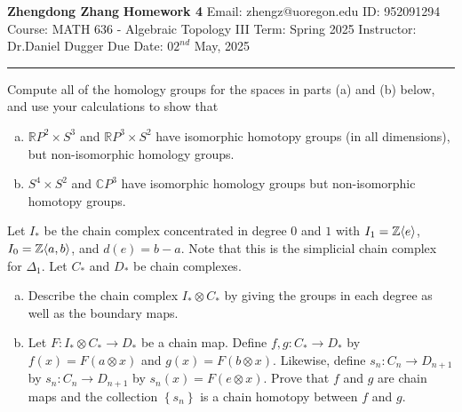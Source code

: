 \documentclass[a4paper, 12pt]{article}
\begin{document}
\noindent

\large\textbf{Zhengdong Zhang} \hfill \textbf{Homework 4}
Email: zhengz@uoregon.edu \hfill ID: 952091294
\normalsize Course: MATH 636 - Algebraic Topology III \hfill Term: Spring 2025
Instructor: Dr.Daniel Dugger \hfill Due Date: $02^{nd}$ May, 2025 
\noindent\rule{7in}{2.8pt}

\begin{problem}{1}
Compute all of the homology groups for the spaces in parts (a) and (b) below, and use your calculations to show that 
\begin{enumerate}[(a)]
\item \(\mathbb{R}P^2\times S^3\) and \(\mathbb{R}P^3\times S^2\) have isomorphic homotopy groups (in all dimensions), but non-isomorphic homology groups. 
\item \(S^4\times S^2\) and \(\mathbb{C}P^3\) have isomorphic homology groups but non-isomorphic homotopy groups. 
\end{enumerate}
\end{problem}

\begin{problem}{2}
Let \(I_*\) be the chain complex concentrated in degree \(0\) and \(1\) with \(I_1=\mathbb{Z}\langle e\rangle\), \(I_0=\mathbb{Z}\langle a,b\rangle\), and \(d(e)=b-a\). Note that this is the 
simplicial chain complex for \(\Delta_1\). Let \(C_*\) and \(D_*\) be chain complexes. 
\begin{enumerate}[(a)]
\item Describe the chain complex \(I_*\otimes C_*\) by giving the groups in each degree as well as the boundary maps.
\item Let \(F:I_*\otimes C_*\rightarrow D_*\) be a chain map. Define \(f,g:C_*\rightarrow D_*\) by \(f(x)=F(a\otimes x)\) and \(g(x)=F(b\otimes x)\). Likewise, define \(s_n:C_n\rightarrow D_{n+1}\) by \(s_n:C_n\rightarrow D_{n+1}\) by \(s_n(x)=F(e\otimes x)\). Prove 
that \(f\) and \(g\) are chain maps and the collection \(\left\{ s_n \right\}\) is a chain homotopy between \(f\) and \(g\). 
\end{enumerate}
\end{problem}
\begin{solution}

\end{solution}
\end{document}
